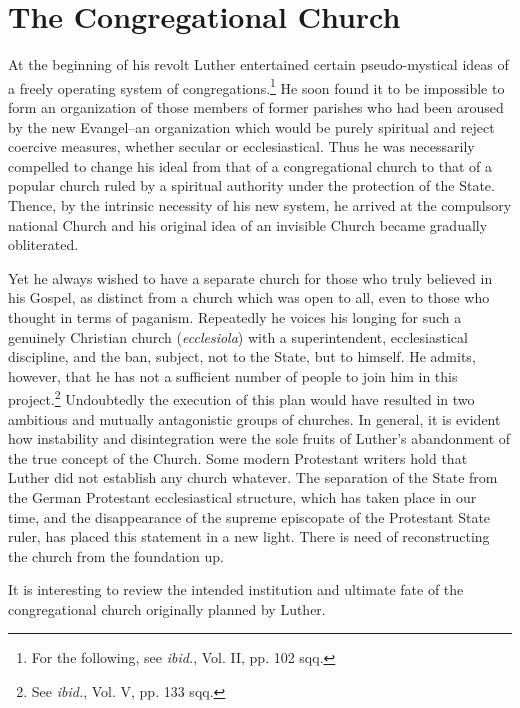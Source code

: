 \section{The Congregational Church}

At the beginning of his revolt Luther entertained certain pseudo-mystical
ideas of a freely operating system of congregations.\footnote
{For the following, see \textit{ibid.}, Vol. II, pp. 102 sqq.}
He soon found it to be impossible to form an organization of those
members of former parishes who had been aroused by the new
Evangel--an organization which would be purely spiritual and reject
coercive measures, whether secular or ecclesiastical. Thus he was
necessarily compelled to change his ideal from that of a congregational
church to that of a popular church ruled by a spiritual
authority under the protection of the State. Thence, by the intrinsic
necessity of his new system, he arrived at the compulsory national
Church and his original idea of an invisible Church became gradually obliterated.

Yet he always wished to have a separate church for those who
truly believed in his Gospel, as distinct from a church which was
open to all, even to those who thought in terms of paganism. Repeatedly
he voices his longing for such a genuinely Christian church
(\textit{ecclesiola}) with a superintendent, ecclesiastical discipline, and the
ban, subject, not to the State, but to himself. He admits, however,
that he has not a sufficient number of people to join him in this
project.\footnote{See \textit{ibid.}, Vol. V, pp. 133 sqq.}
Undoubtedly the execution of this plan would have resulted
in two ambitious and mutually antagonistic groups of
churches. In general, it is evident how instability and disintegration
were the sole fruits of Luther’s abandonment of the true concept
of the Church. Some modern Protestant writers hold that Luther
did not establish any church whatever. The separation of the State
from the German Protestant ecclesiastical structure, which has taken
place in our time, and the disappearance of the supreme episcopate
of the Protestant State ruler, has placed this statement in a new
light. There is need of reconstructing the church from the foundation up.

It is interesting to review the intended institution and ultimate
fate of the congregational church originally planned by Luther.

